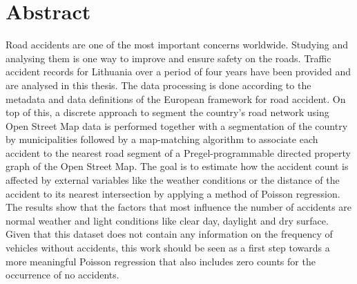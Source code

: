 \chapter*{Abstract}
\begin{comment}
Sell your idea!
Make the reader want to stay with you!
Single paragraph, 100-200 words

Four parts/sentences
1. What's the problem
2. How did you solve it
3. What are the results
4. Conclusion (what it means for the future)
Make sure the abstract stands on its own!
-No reference tags
- Avoid acronyms

\end{comment}

Road accidents are one of the most important concerns worldwide. 
Studying and analysing them is one way to improve and ensure safety on the roads. 
Traffic accident records for Lithuania over a period of four years have been provided and are analysed in this thesis. 
The data processing is done according to the metadata and data definitions of the European framework for road accident. 
On top of this, a discrete approach to segment the country's road network using Open Street Map data is performed together with a segmentation of the country by municipalities followed by a map-matching algorithm to associate each accident to the nearest road segment of a Pregel-programmable directed property graph of the Open Street Map. 
The goal is to estimate how the accident count is affected by external variables like the weather conditions or the distance of the accident to its nearest intersection by applying a method of Poisson regression. 
The results show that the factors that most influence the number of accidents are normal weather and light conditions like clear day, daylight and dry surface. 
Given that this dataset does not contain any information on the frequency of vehicles without accidents, this work should be seen as a first step towards a more meaningful Poisson regression that also includes zero counts for the occurrence of no accidents.

